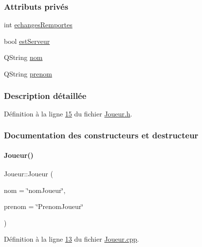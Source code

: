 \subsubsection*{Attributs privés}
\begin{DoxyCompactItemize}
\item 
int \hyperlink{class_joueur_a23ab203e6bbfc1b2679a8457b99206dc}{echanges\+Remportes}
\item 
bool \hyperlink{class_joueur_ac22161c9510ed38d6c65cdf6315737a5}{est\+Serveur}
\item 
Q\+String \hyperlink{class_joueur_ab06d7f1e6b482299bb03919e0cd2166d}{nom}
\item 
Q\+String \hyperlink{class_joueur_a96d4237143c2e57b8025c4e116e95909}{prenom}
\end{DoxyCompactItemize}


\subsubsection{Description détaillée}


Définition à la ligne \hyperlink{_joueur_8h_source_l00015}{15} du fichier \hyperlink{_joueur_8h_source}{Joueur.\+h}.



\subsubsection{Documentation des constructeurs et destructeur}
\mbox{\label{class_joueur_a75f73a73741b0faa59c75fc98b872765}} 
\paragraph{\texorpdfstring{Joueur()}{Joueur()}}
{\footnotesize\ttfamily Joueur\+::\+Joueur (\begin{DoxyParamCaption}\item[{Q\+String}]{nom = {\ttfamily \char`\"{}nomJoueur\char`\"{}},  }\item[{Q\+String}]{prenom = {\ttfamily \char`\"{}PrenomJoueur\char`\"{}} }\end{DoxyParamCaption})}



Définition à la ligne \hyperlink{_joueur_8cpp_source_l00013}{13} du fichier \hyperlink{_joueur_8cpp_source}{Joueur.\+cpp}.



